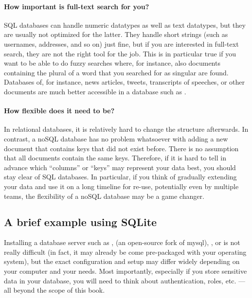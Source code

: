 \paragraph{How important is full-text search for you?} SQL databases can handle numeric datatypes as well as text datatypes, but they are usually not optimized for the latter. They handle short strings (such as usernames, addresses, and so on) just fine, but if you are interested in full-text search, they are not the right tool for the job. This is in particular true if you want to be able to do fuzzy searches where, for instance, also documents containing the plural of a word that you searched for as singular are found. Databases of, for instance, news articles, tweets, transcripts of speeches, or other documents are much better accessible in a database such as .


\paragraph{How flexible does it need to be?} In relational databases, it is relatively hard to change the structure afterwards. In contrast, a noSQL database has no problem whatsoever with adding a new document that contains keys that did not exist before. There is no assumption that all documents contain the same keys. Therefore, if it is hard to tell in advance which ``columns'' or ``keys'' may represent your data best, you should stay clear of SQL databases. In particular, if you think of gradually extending your data and use it on a long timeline for re-use, potentially even by multiple teams, the flexibility of a noSQL database may be a game changer.



\subsection{A brief example using SQLite}

Installing a database server such as ,  (an
open-source fork of mysql), , or  is
not really difficult (in fact, it may already be come pre-packaged
with your operating system), but the exact configuration and setup may
differ widely depending on your computer and your needs. Most
importantly, especially if you store sensitive data in your database,
you will need to think about authentication, roles, etc. --- all
beyond the scope of this book.

